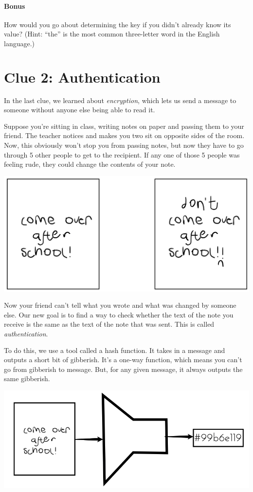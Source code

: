 \documentclass{article}
\begin{document}
\paragraph{Bonus} How would you go about determining the key if you didn't already know its value? (Hint: ``the'' is the most common three-letter word in the English language.)

\newpage

\section*{Clue 2: Authentication}

In the last clue, we learned about \textit{encryption}, which lets us send a message to someone without anyone else being able to read it. 

Suppose you're sitting in class, writing notes on paper and passing them to your friend. The teacher notices and makes you two sit on opposite sides of the room. Now, this obviously won't stop you from passing notes, but now they have to go through 5 other people to get to the recipient. If any one of those 5 people was feeling rude, they could change the contents of your note.

\begin{minipage}{\textwidth}
\centering
\includegraphics[width=.6\textwidth]{tampered}
\end{minipage}

Now your friend can't tell what you wrote and what was changed by someone else. Our new goal is to find a way to check whether the text of the note you receive is the same as the text of the note that was sent. This is called \textit{authentication}.

To do this, we use a tool called a hash function. It takes in a message and outputs a short bit of gibberish. It's a one-way function, which means you can't go from gibberish to message. But, for any given message, it always outputs the same gibberish. 

\begin{minipage}{\textwidth}
\centering
\includegraphics[width=.7\textwidth]{hash}
\end{minipage}
\end{document}
